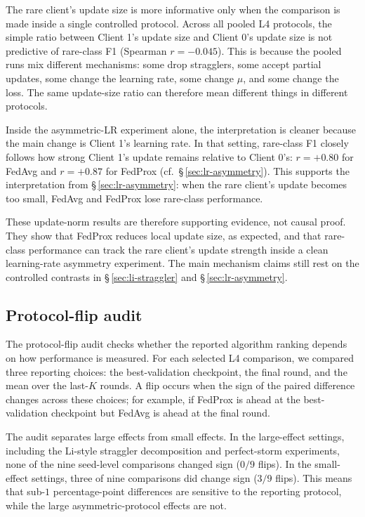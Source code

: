 \documentclass[11pt,a4paper]{report}
\begin{document}
The rare client's update size is more informative only when the comparison is
made inside a single controlled protocol. Across all pooled L4 protocols, the
simple ratio between Client 1's update size and Client 0's update size is not
predictive of rare-class F1 (Spearman $r=-0.045$). This is because the pooled
runs mix different mechanisms: some drop stragglers, some accept partial
updates, some change the learning rate, some change $\mu$, and some change
the loss. The same update-size ratio can therefore mean different things in
different protocols.

Inside the asymmetric-LR experiment alone, the interpretation is cleaner
because the main change is Client 1's learning rate. In that setting, rare-class
F1 closely follows how strong Client 1's update remains relative to Client 0's:
$r=+0.80$ for FedAvg and $r=+0.87$ for FedProx
(cf.\ \S\,\ref{sec:lr-asymmetry}). This supports the interpretation from
\S\,\ref{sec:lr-asymmetry}: when the rare client's update becomes too small,
FedAvg and FedProx lose rare-class performance.

These update-norm results are therefore supporting evidence, not causal proof.
They show that FedProx reduces local update size, as expected, and that rare-
class performance can track the rare client's update strength inside a clean
learning-rate asymmetry experiment. The main mechanism claims still rest on
the controlled contrasts in \S\,\ref{sec:li-straggler} and
\S\,\ref{sec:lr-asymmetry}.
\subsection{Protocol-flip audit}

The protocol-flip audit checks whether the reported algorithm ranking depends
on how performance is measured. For each selected L4 comparison, we compared
three reporting choices: the best-validation checkpoint, the final round, and
the mean over the last-$K$ rounds. A flip occurs when the sign of the paired
difference changes across these choices; for example, if FedProx is ahead at
the best-validation checkpoint but FedAvg is ahead at the final round.

The audit separates large effects from small effects. In the large-effect
settings, including the Li-style straggler decomposition and perfect-storm
experiments, none of the nine seed-level comparisons changed sign
($0/9$ flips). In the small-effect settings, three of nine comparisons did
change sign ($3/9$ flips). This means that sub-$1$ percentage-point
differences are sensitive to the reporting protocol, while the large
asymmetric-protocol effects are not.
\end{document}
